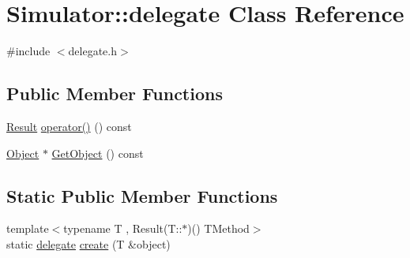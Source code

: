 \hypertarget{class_simulator_1_1delegate}{\section{Simulator\+:\+:delegate Class Reference}
\label{class_simulator_1_1delegate}
}


{\ttfamily \#include $<$delegate.\+h$>$}

\subsection*{Public Member Functions}
\begin{DoxyCompactItemize}
\item 
\hyperlink{namespace_simulator_a4b6b5616e7236c0c131516a441776805}{Result} \hyperlink{class_simulator_1_1delegate_a8fc9843df63a0dc7838b0f449aa993be}{operator()} () const 
\item 
\hyperlink{class_simulator_1_1_object}{Object} $\ast$ \hyperlink{class_simulator_1_1delegate_a3943bdb0cf2781214226b809a357c86d}{Get\+Object} () const 
\end{DoxyCompactItemize}
\subsection*{Static Public Member Functions}
\begin{DoxyCompactItemize}
\item 
{\footnotesize template$<$typename T , Result(\+T\+::$\ast$)() T\+Method$>$ }\\static \hyperlink{class_simulator_1_1delegate}{delegate} \hyperlink{class_simulator_1_1delegate_a1e68440f33e3d945bc2823880abaa114}{create} (T \&object)
\end{DoxyCompactItemize}



